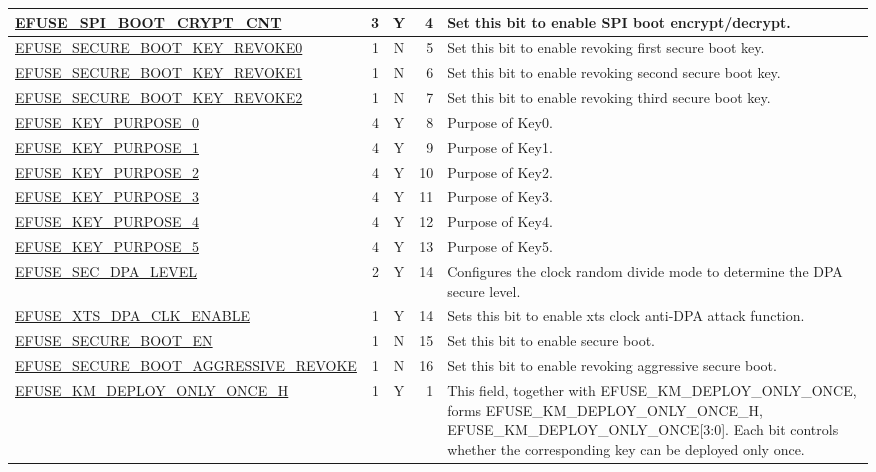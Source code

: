 \begin{longtable}[l]{ |m{8.2cm}|r|c|r|m{9cm}| }
    \hyperref[fielddesc:EFUSESPIBOOTCRYPTCNT]{EFUSE\_SPI\_BOOT\_CRYPT\_CNT} & 3 & Y & 4 & Set this bit to enable SPI boot encrypt/decrypt. \\ \hline
    \hyperref[fielddesc:EFUSESECUREBOOTKEYREVOKE0]{EFUSE\_SECURE\_BOOT\_KEY\_REVOKE0} & 1 & N & 5 & Set this bit to enable revoking first secure boot key. \\ \hline
    \hyperref[fielddesc:EFUSESECUREBOOTKEYREVOKE1]{EFUSE\_SECURE\_BOOT\_KEY\_REVOKE1} & 1 & N & 6 & Set this bit to enable revoking second secure boot key. \\ \hline
    \hyperref[fielddesc:EFUSESECUREBOOTKEYREVOKE2]{EFUSE\_SECURE\_BOOT\_KEY\_REVOKE2} & 1 & N & 7 & Set this bit to enable revoking third secure boot key. \\ \hline
    \hyperref[fielddesc:EFUSEKEYPURPOSE0]{EFUSE\_KEY\_PURPOSE\_0} & 4 & Y & 8 & Purpose of Key0. \\ \hline
    \hyperref[fielddesc:EFUSEKEYPURPOSE1]{EFUSE\_KEY\_PURPOSE\_1} & 4 & Y & 9 & Purpose of Key1. \\ \hline
    \hyperref[fielddesc:EFUSEKEYPURPOSE2]{EFUSE\_KEY\_PURPOSE\_2} & 4 & Y & 10 & Purpose of Key2. \\ \hline
    \hyperref[fielddesc:EFUSEKEYPURPOSE3]{EFUSE\_KEY\_PURPOSE\_3} & 4 & Y & 11 & Purpose of Key3. \\ \hline
    \hyperref[fielddesc:EFUSEKEYPURPOSE4]{EFUSE\_KEY\_PURPOSE\_4} & 4 & Y & 12 & Purpose of Key4. \\ \hline
    \hyperref[fielddesc:EFUSEKEYPURPOSE5]{EFUSE\_KEY\_PURPOSE\_5} & 4 & Y & 13 & Purpose of Key5. \\ \hline
    \hyperref[fielddesc:EFUSESECDPALEVEL]{EFUSE\_SEC\_DPA\_LEVEL} & 2 & Y & 14 & Configures the clock random divide mode to determine the DPA secure level. \\ \hline
    \hyperref[fielddesc:EFUSEXTSDPACLKENABLE]{EFUSE\_XTS\_DPA\_CLK\_ENABLE} & 1 & Y & 14 & Sets this bit to enable xts clock anti-DPA attack function. \\ \hline
    \hyperref[fielddesc:EFUSESECUREBOOTEN]{EFUSE\_SECURE\_BOOT\_EN} & 1 & N & 15 & Set this bit to enable secure boot. \\ \hline
    \hyperref[fielddesc:EFUSESECUREBOOTAGGRESSIVEREVOKE]{EFUSE\_SECURE\_BOOT\_AGGRESSIVE\_REVOKE} & 1 & N & 16 & Set this bit to enable revoking aggressive secure boot. \\ \hline
    \hyperref[fielddesc:EFUSEKMDEPLOYONLYONCEH]{EFUSE\_KM\_DEPLOY\_ONLY\_ONCE\_H} & 1 & Y & 1 & This field, together with EFUSE\_\-KM\_\-DEPLOY\_\-ONLY\_\-ONCE, forms  {EFUSE\_\-KM\_\-DEPLOY\_\-ONLY\_\-ONCE\_\-H, EFUSE\_\-KM\_DEPLOY\_\-ONLY\_\-ONCE[3:0]}. Each bit controls whether the corresponding key can be deployed only once.\\ \hline


\end{longtable}
